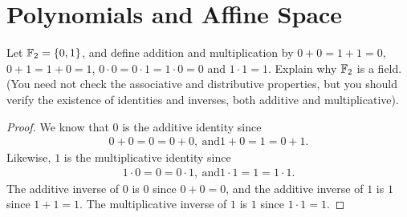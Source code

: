 \section{Polynomials and Affine Space}


\begin{exercise}{1}
Let $\mathbb{F}_2 = \{0,1\}$, and define addition and multiplication by $0+0 = 1+1 = 0$, $0+1 = 1+0 = 1$, $0\cdot 0 = 0\cdot 1 = 1\cdot 0 = 0$ and $1\cdot 1 = 1$. 
Explain why $\mathbb{F}_2$ is a field. 
(You need not check the associative and distributive properties, but you should verify the existence of identities and inverses, both additive and multiplicative).
\end{exercise}
\begin{proof}
    We know that $0$ is the additive identity since
    \begin{align*}
        0 + 0 = 0 = 0+0,~\text{and} 1+0 = 1 = 0+1.
    \end{align*}
    Likewise, $1$ is the multiplicative identity since
    \begin{align*}
        1\cdot 0 = 0 = 0\cdot 1,~\text{and} 1\cdot 1 = 1 = 1\cdot 1.
    \end{align*}
   The additive inverse of $0$ is $0$ since $0+0=0$, and the additive inverse of $1$ is $1$ since $1+1=1$. 
   The multiplicative inverse of $1$ is $1$ since $1\cdot 1 = 1$.
\end{proof}

